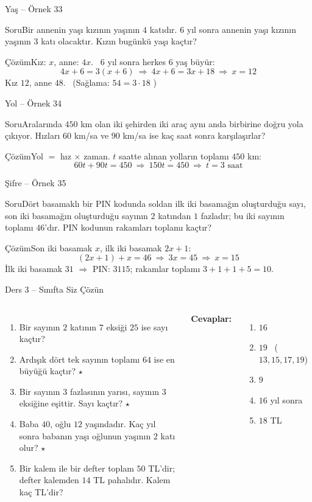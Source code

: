 \documentclass[aspectratio=169,11pt,handout]{beamer}
\newcommand{\soru}[3]{%
\begin{frame}{#1}
  \begin{block}{Soru}\large #2\end{block}
  \pause
  \begin{exampleblock}{Çözüm}\large #3\end{exampleblock}
\end{frame}}
\begin{document}
\soru{Yaş -- Örnek 33}
{Bir annenin yaşı kızının yaşının \(4\) katıdır. \(6\) yıl sonra annenin yaşı kızının yaşının \(3\) katı olacaktır. Kızın bugünkü yaşı kaçtır?}
{Kız: \(x\), anne: \(4x\). \ \(6\) yıl sonra herkes \(6\) yaş büyür:
\[4x+6=3(x+6)\ \Rightarrow\ 4x+6=3x+18\ \Rightarrow\ x=12\]
Kız \(12\), anne \(48\). \ (Sağlama: \(54=3\cdot 18\) \checkmark)}

\soru{Yol -- Örnek 34}
{Aralarında \(450\) km olan iki şehirden iki araç aynı anda birbirine doğru yola çıkıyor. Hızları \(60\) km/sa ve \(90\) km/sa ise kaç saat sonra karşılaşırlar?}
{Yol \(=\) hız \(\times\) zaman. \(t\) saatte alınan yolların toplamı \(450\) km:
\[60t+90t=450\ \Rightarrow\ 150t=450\ \Rightarrow\ t=3 \text{ saat}\]}

\soru{Şifre -- Örnek 35}
{Dört basamaklı bir PIN kodunda soldan ilk iki basamağın oluşturduğu sayı, son iki basamağın oluşturduğu sayının \(2\) katından \(1\) fazladır; bu iki sayının toplamı \(46\)'dır. PIN kodunun rakamları toplamı kaçtır?}
{Son iki basamak \(x\), ilk iki basamak \(2x+1\):
\[(2x+1)+x=46\ \Rightarrow\ 3x=45\ \Rightarrow\ x=15\]
İlk iki basamak \(31\) \(\Rightarrow\) PIN: \(3115\); rakamlar toplamı \(3+1+1+5=10\).}

\begin{frame}{Ders 3 -- Sınıfta Siz Çözün}
\begin{columns}[t]
\begin{enumerate}
\item Bir sayının \(2\) katının \(7\) eksiği \(25\) ise sayı kaçtır?
\item Ardışık dört tek sayının toplamı \(64\) ise en büyüğü kaçtır? \(\star\)
\item Bir sayının \(3\) fazlasının yarısı, sayının \(3\) eksiğine eşittir. Sayı kaçtır? \(\star\)
\item Baba \(40\), oğlu \(12\) yaşındadır. Kaç yıl sonra babanın yaşı oğlunun yaşının \(2\) katı olur? \(\star\)
\item Bir kalem ile bir defter toplam \(50\) TL'dir; defter kalemden \(14\) TL pahalıdır. Kalem kaç TL'dir?
\end{enumerate}
\pause
\textbf{Cevaplar:}
\begin{enumerate}
\item \(16\)\\[8pt]
\item \(19\) \ (\(13,15,17,19\))\\[8pt]
\item \(9\)\\[8pt]
\item \(16\) yıl sonra\\[8pt]
\item \(18\) TL
\end{enumerate}
\end{columns}
\vspace{4pt}{\footnotesize \(\star\) işaretli soruların adım adım çözümü sonraki slaytlardadır.}
\end{frame}
\end{document}
